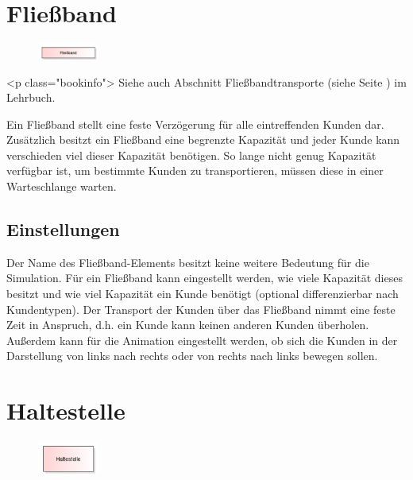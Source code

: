 \section{Fließband}
\label{ref:ModelElementConveyor}

\begin{figure}
\vspace{-22pt}
\includegraphics[width=2cm]{imageModelElementConveyor.png}
\vspace{-22pt}
\end{figure}

<p class="bookinfo">
Siehe auch Abschnitt Fließbandtransporte (siehe Seite \pageref{ref:book:8.3.4}) im Lehrbuch.

Ein Fließband stellt eine feste Verzögerung für alle eintreffenden Kunden dar.
Zusätzlich besitzt ein Fließband eine begrenzte Kapazität und jeder Kunde
kann verschieden viel dieser Kapazität benötigen. So lange nicht genug
Kapazität verfügbar ist, um bestimmte Kunden zu transportieren, müssen diese
in einer Warteschlange warten.

\subsection*{Einstellungen}

Der Name des Fließband-Elements besitzt keine weitere Bedeutung
für die Simulation. Für ein Fließband kann eingestellt werden,
wie viele Kapazität dieses besitzt und wie viel Kapazität ein
Kunde benötigt (optional differenzierbar nach Kundentypen). Der
Transport der Kunden über das Fließband nimmt eine feste Zeit in
Anspruch, d.h. ein Kunde kann keinen anderen Kunden überholen.
Außerdem kann für die Animation eingestellt werden, ob sich die
Kunden in der Darstellung von links nach rechts oder von rechts
nach links bewegen sollen.


\section{Haltestelle}
\label{ref:ModelElementTransportTransporterSource}

\begin{figure}
\vspace{-22pt}
\includegraphics[width=2cm]{imageModelElementTransportTransporterSource.png}
\vspace{-22pt}
\end{figure}

